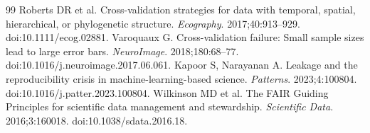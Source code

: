 \documentclass[10pt,a4paper]{article}
\begin{document}
\begin{thebibliography}{99}
 Roberts DR et al. Cross-validation strategies for data with temporal, spatial, hierarchical, or phylogenetic structure. \emph{Ecography}. 2017;40:913--929. doi:10.1111/ecog.02881.
 Varoquaux G. Cross-validation failure: Small sample sizes lead to large error bars. \emph{NeuroImage}. 2018;180:68--77. doi:10.1016/j.neuroimage.2017.06.061.
 Kapoor S, Narayanan A. Leakage and the reproducibility crisis in machine-learning-based science. \emph{Patterns}. 2023;4:100804. doi:10.1016/j.patter.2023.100804.
 Wilkinson MD et al. The FAIR Guiding Principles for scientific data management and stewardship. \emph{Scientific Data}. 2016;3:160018. doi:10.1038/sdata.2016.18.
\end{thebibliography}
\end{document}
